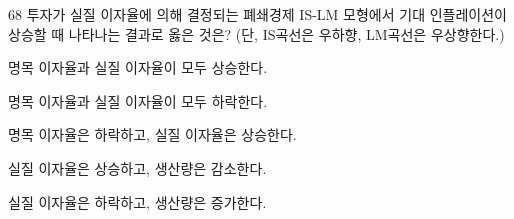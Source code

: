 \begin{question}{68}
투자가 실질 이자율에 의해 결정되는 폐쇄경제 IS-LM 모형에서 기대 인플레이션이 상승할 때 나타나는 결과로 옳은 것은? (단, IS곡선은 우하향, LM곡선은 우상향한다.)
\begin{choices}
  \item 명목 이자율과 실질 이자율이 모두 상승한다.
  \item 명목 이자율과 실질 이자율이 모두 하락한다.
  \item 명목 이자율은 하락하고, 실질 이자율은 상승한다.
  \item 실질 이자율은 상승하고, 생산량은 감소한다.
  \item 실질 이자율은 하락하고, 생산량은 증가한다.
\end{choices}
\end{question}
